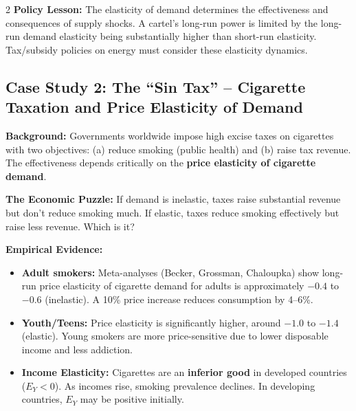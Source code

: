 \documentclass[10pt,a4paper]{article}
\begin{document}
\begin{multicols}{2}
\textbf{Policy Lesson:} The elasticity of demand determines the effectiveness and consequences of supply shocks. A cartel's long-run power is limited by the long-run demand elasticity being substantially higher than short-run elasticity. Tax/subsidy policies on energy must consider these elasticity dynamics.

\subsection*{Case Study 2: The ``Sin Tax'' -- Cigarette Taxation and Price Elasticity of Demand}

\textbf{Background:} Governments worldwide impose high excise taxes on cigarettes with two objectives: (a) reduce smoking (public health) and (b) raise tax revenue. The effectiveness depends critically on the \textbf{price elasticity of cigarette demand}.

\textbf{The Economic Puzzle:} If demand is inelastic, taxes raise substantial revenue but don't reduce smoking much. If elastic, taxes reduce smoking effectively but raise less revenue. Which is it?

\textbf{Empirical Evidence:}
\begin{itemize}[leftmargin=*,nosep]
    \item \textbf{Adult smokers:} Meta-analyses (Becker, Grossman, Chaloupka) show long-run price elasticity of cigarette demand for adults is approximately $-0.4$ to $-0.6$ (inelastic). A 10\% price increase reduces consumption by 4--6\%.
    \item \textbf{Youth/Teens:} Price elasticity is significantly higher, around $-1.0$ to $-1.4$ (elastic). Young smokers are more price-sensitive due to lower disposable income and less addiction.
    \item \textbf{Income Elasticity:} Cigarettes are an \textbf{inferior good} in developed countries ($E_Y < 0$). As incomes rise, smoking prevalence declines. In developing countries, $E_Y$ may be positive initially.
\end{itemize}


\end{multicols}
\end{document}
